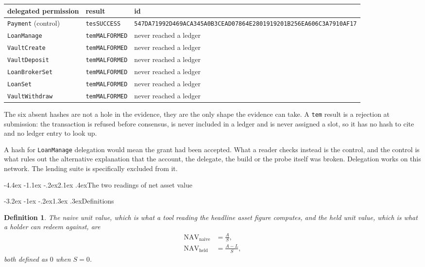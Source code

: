 \documentclass[11pt]{article}
\makeatletter
\renewcommand{\arraystretch}{1.22}
\renewcommand\section{\@startsection{section}{1}{\z@}%
  {-4.4ex \@plus -1.1ex \@minus -.2ex}{2.1ex \@plus .4ex}{\normalfont\Large\bfseries}}
\renewcommand\subsection{\@startsection{subsection}{2}{\z@}%
  {-3.2ex \@plus -1ex \@minus -.2ex}{1.3ex \@plus .3ex}{\normalfont\large\bfseries}}
\theoremstyle{orma}
\theoremstyle{ormaupright}
\newtheorem{definition}[theorem]{Definition}
\makeatother
\begin{document}
\begin{center}
\scriptsize
\setlength{\tabcolsep}{5pt}
\renewcommand{\arraystretch}{1.35}
\begin{tabular}{lll}
\toprule
delegated permission & result & id \\
\midrule
\texttt{Payment} (control) & \texttt{tesSUCCESS} & \texttt{547DA71992D469ACA345A0B3CEAD07864E2801919201B256EA606C3A7910AF17} \\
\addlinespace
\texttt{LoanManage} & \texttt{temMALFORMED} & never reached a ledger \\
\texttt{VaultCreate} & \texttt{temMALFORMED} & never reached a ledger \\
\texttt{VaultDeposit} & \texttt{temMALFORMED} & never reached a ledger \\
\texttt{LoanBrokerSet} & \texttt{temMALFORMED} & never reached a ledger \\
\texttt{LoanSet} & \texttt{temMALFORMED} & never reached a ledger \\
\texttt{VaultWithdraw} & \texttt{temMALFORMED} & never reached a ledger \\
\bottomrule
\end{tabular}
\end{center}

The six absent hashes are not a hole in the evidence, they are the only shape the evidence
can take. A \texttt{tem} result is a rejection at submission: the transaction is refused
before consensus, is never included in a ledger and is never assigned a slot, so it has no
hash to cite and no ledger entry to look up.

A hash for \texttt{LoanManage} delegation would
mean the grant had been accepted. What a reader checks instead is the control, and the
control is what rules out the alternative explanation that the account, the delegate, the
build or the probe itself was broken. Delegation works on this network. The lending suite is
specifically excluded from it.

\section{The two readings of net asset value}

\subsection{Definitions}

\begin{definition}
The \emph{naive} unit value, which is what a tool reading the headline asset figure
computes, and the \emph{held} unit value, which is what a holder can redeem against, are
\begin{align}
  \mathrm{NAV}_{\mathrm{naive}} &= \frac{A}{S},
  \\[4pt]
  \mathrm{NAV}_{\mathrm{held}} &= \frac{A - L}{S},
\end{align}
both defined as $0$ when $S = 0$.
\end{definition}
\end{document}
